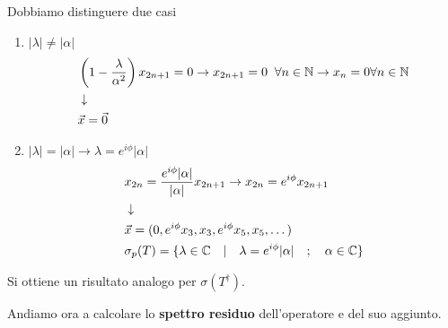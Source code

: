 \begin{enumerate}
		\newpage
		Dobbiamo distinguere due casi
		\begin{enumerate}
			\item $|\lambda| \neq |\alpha|$
				\begin{align}
					&\left(1 - \frac{\lambda}{\alpha^2}\right) x_{2n+1} = 0 \to x_{2n+1} = 0 \;\; \forall n \in \mathbb{N} \to x_n = 0 \forall n\in \mathbb{N} \\ &\downarrow \nonumber \\
					&\vec{x} = \vec{0}
				\end{align}
			\item $|\lambda| = |\alpha| \to \lambda = e^{i\phi} |\alpha|$
				\begin{align}
					&x_{2n} =\frac{e^{i\phi} |\alpha|}{|\alpha|} x_{2n+1} \to x_{2n} = e^{i\phi}x_{2n+1}\\ &\downarrow \nonumber \\
					&\vec{x} = (0, e^{i\phi}x_{3}, x_3, e^{i\phi}x_{5}, x_5,\dots)\\
					&\sigma_p(T) = \{ \lambda \in \mathbb{C} \quad|\quad \lambda = e^{i\phi} |\alpha| \quad ; \quad \alpha \in \mathbb{C} \}
				\end{align}
		\end{enumerate}
\end{enumerate}

Si ottiene un risultato analogo per $\sigma(T^\dagger)$.

Andiamo ora a calcolare lo \textbf{spettro residuo} dell'operatore e del suo aggiunto.

